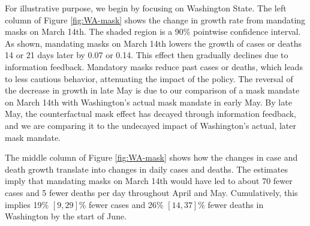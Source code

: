 \documentclass[3p, longtitle]{elsarticle}
\theoremstyle{definition}
\begin{document}
For illustrative purpose, we begin by focusing on Washington State.
The left column of Figure \ref{fig:WA-mask} shows the change in
growth rate from mandating masks on March 14th. The shaded region is a
90\% pointwise confidence interval. As shown, mandating masks on March 14th lowers the growth of cases or deaths 14 or 21 days later by 0.07 or
0.14. This effect then gradually declines due to information
feedback. Mandatory masks reduce past cases or deaths, which leads to
less cautious behavior, attenuating the impact of the policy. The
reversal of the decrease in growth in late May is due to our
comparison of a mask mandate on March 14th with Washington's actual
mask mandate in early May. By late May, the counterfactual mask
effect has decayed through information feedback, and we are comparing
it to the undecayed impact of Washington's actual, later mask mandate.

The middle column of Figure \ref{fig:WA-mask} shows how the changes in
case and death growth translate into changes in daily cases and
deaths. The estimates imply that mandating masks on March 14th would
have led to about 70 fewer cases and 5 fewer deaths per day throughout
April and May. Cumulatively, this implies 19\% $[9,29]$\% fewer cases and 26\%
$[14,37]$\% fewer deaths in Washington by the start of June.
\end{document}
